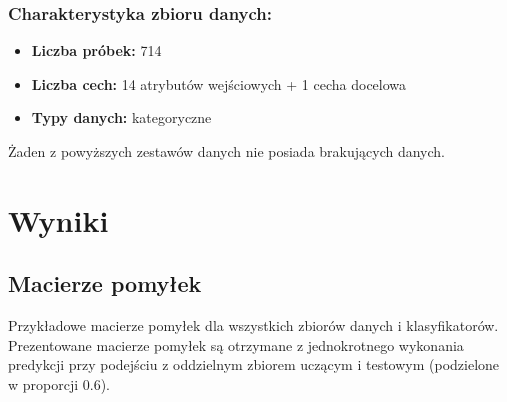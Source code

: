 \documentclass{article}
\begin{document}
\subsubsection*{Charakterystyka zbioru danych:}

\begin{itemize}
    \item \textbf{Liczba próbek:} 714
    \item \textbf{Liczba cech:} 14 atrybutów wejściowych + 1 cecha docelowa
    \item \textbf{Typy danych:} kategoryczne
\end{itemize}

Żaden z powyższych zestawów danych nie posiada brakujących danych.

\section{Wyniki}

\subsection*{Macierze pomyłek}
Przykładowe macierze pomyłek dla wszystkich zbiorów danych i klasyfikatorów.
Prezentowane macierze pomyłek są otrzymane z jednokrotnego wykonania predykcji przy podejściu z oddzielnym zbiorem uczącym i testowym (podzielone w proporcji $0.6$).
\end{document}
